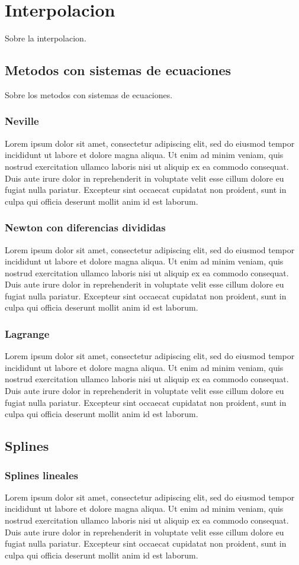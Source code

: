 \documentclass[11pt]{article}
\begin{document}
\newpage
\section{Interpolacion}
Sobre la interpolacion.
\subsection{Metodos con sistemas de ecuaciones}
Sobre los metodos con sistemas de ecuaciones.
\subsubsection{Neville}
Lorem ipsum dolor sit amet, consectetur adipiscing elit, sed do eiusmod tempor incididunt ut labore et dolore magna aliqua. Ut enim ad minim veniam, quis nostrud exercitation ullamco laboris nisi ut aliquip ex ea commodo consequat. Duis aute irure dolor in reprehenderit in voluptate velit esse cillum dolore eu fugiat nulla pariatur. Excepteur sint occaecat cupidatat non proident, sunt in culpa qui officia deserunt mollit anim id est laborum.
\subsubsection{Newton con diferencias divididas}
Lorem ipsum dolor sit amet, consectetur adipiscing elit, sed do eiusmod tempor incididunt ut labore et dolore magna aliqua. Ut enim ad minim veniam, quis nostrud exercitation ullamco laboris nisi ut aliquip ex ea commodo consequat. Duis aute irure dolor in reprehenderit in voluptate velit esse cillum dolore eu fugiat nulla pariatur. Excepteur sint occaecat cupidatat non proident, sunt in culpa qui officia deserunt mollit anim id est laborum.
\subsubsection{Lagrange}
Lorem ipsum dolor sit amet, consectetur adipiscing elit, sed do eiusmod tempor incididunt ut labore et dolore magna aliqua. Ut enim ad minim veniam, quis nostrud exercitation ullamco laboris nisi ut aliquip ex ea commodo consequat. Duis aute irure dolor in reprehenderit in voluptate velit esse cillum dolore eu fugiat nulla pariatur. Excepteur sint occaecat cupidatat non proident, sunt in culpa qui officia deserunt mollit anim id est laborum.
\subsection{Splines}
\subsubsection{Splines lineales}
Lorem ipsum dolor sit amet, consectetur adipiscing elit, sed do eiusmod tempor incididunt ut labore et dolore magna aliqua. Ut enim ad minim veniam, quis nostrud exercitation ullamco laboris nisi ut aliquip ex ea commodo consequat. Duis aute irure dolor in reprehenderit in voluptate velit esse cillum dolore eu fugiat nulla pariatur. Excepteur sint occaecat cupidatat non proident, sunt in culpa qui officia deserunt mollit anim id est laborum.
\end{document}
